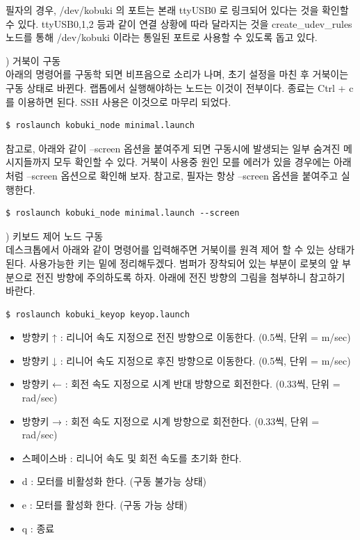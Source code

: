 필자의 경우, /dev/kobuki 의 포트는 본래 ttyUSB0 로 링크되어 있다는 것을 확인할 수 있다. ttyUSB0,1,2 등과 같이 연결 상황에 따라 달라지는 것을 create\_udev\_rules 노드를 통해 /dev/kobuki 이라는 통일된 포트로 사용할 수 있도록 돕고 있다.

\vspace{\baselineskip}
\noindent{}
\thenum) 거북이 구동\\
아래의 명령어를 구동학 되면 비프음으로 소리가 나며, 초기 설정을 마친 후 거북이는 구동 상태로 바뀐다. 랩톱에서 실행해야하는 노드는 이것이 전부이다. 종료는 Ctrl + c 를 이용하면 된다. SSH 사용은 이것으로 마무리 되었다.

\begin{lstlisting}[language=ROS]
$ roslaunch kobuki_node minimal.launch
\end{lstlisting}

\vspace{\baselineskip}
\noindent
참고로, 아래와 같이 --screen 옵션을 붙여주게 되면 구동시에 발생되는 일부 숨겨진 메시지들까지 모두 확인할 수 있다. 거북이 사용중 원인 모를 에러가 있을 경우에는 아래처럼 --screen 옵션으로 확인해 보자. 참고로, 필자는 항상 --screen 옵션을 붙여주고 실행한다.

\begin{lstlisting}[language=ROS]
$ roslaunch kobuki_node minimal.launch --screen 
\end{lstlisting}

\vspace{\baselineskip}
\noindent{}
\thenum) 키보드 제어 노드 구동\\
데스크톱에서 아래와 같이 명령어를 입력해주면 거북이를 원격 제어 할 수 있는 상태가 된다. 사용가능한 키는 밑에 정리해두겠다. 범퍼가 장착되어 있는 부분이 로봇의 앞 부분으로 전진 방향에 주의하도록 하자. 아래에 전진 방향의 그림을 첨부하니 참고하기 바란다.

\begin{lstlisting}[language=ROS]
$ roslaunch kobuki_keyop keyop.launch
\end{lstlisting}

\begin{itemize}[leftmargin=*]
\item 방향키 ↑ : 리니어 속도 지정으로 전진 방향으로 이동한다. (0.5씩, 단위 = m/sec) 
\item 방향키 ↓ : 리니어 속도 지정으로 후진 방향으로 이동한다. (0.5씩, 단위 = m/sec) 
\item 방향키 ← : 회전 속도 지정으로 시계 반대 방향으로 회전한다. (0.33씩, 단위 = rad/sec) 
\item 방향키 → : 회전 속도 지정으로 시계 방향으로 회전한다. (0.33씩, 단위 = rad/sec) 
\item 스페이스바 : 리니어 속도 및 회전 속도를 초기화 한다.
\item d : 모터를 비활성화 한다. (구동 불가능 상태)
\item e : 모터를 활성화 한다. (구동 가능 상태)
\item q : 종료
\end{itemize}

